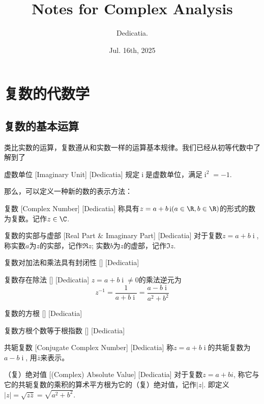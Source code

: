 \documentclass[UTF8]{ctexart}
\title{Notes for Complex Analysis}
\author{Dedicatia.}
\date{Jul. 16th, 2025}
\DeclareMathOperator{\ii}{\mathrm{i}}
\begin{document}
\maketitle
\newpage
\tableofcontents
\newpage
\section{复数的代数学}
\subsection{复数的基本运算}
类比实数的运算，复数遵从和实数一样的运算基本规律。我们已经从初等代数中了解到了
\begin{dfn}
    [UUID]
    {虚数单位}
    [Imaginary Unit]
    [Dedicatia]
    规定$\ii$是虚数单位，满足$\ii^2=-1$.
\end{dfn}
那么，可以定义一种新的数的表示方法：
\begin{dfn}
    [UUID]
    {复数}
    [Complex Number]
    [Dedicatia]
    称具有$z=a+b\ii (a\in\R, b\in\R)$的形式的数为复数。记作$z\in\C$.
\end{dfn}
\begin{dfn}
    [UUID]
    {复数的实部与虚部}
    [Real Part \& Imaginary Part]
    [Dedicatia]
    对于复数$z=a+b\ii$, 称实数$a$为$z$的实部，记作$\Re z$; 实数$b$为$z$的虚部，记作$\Im z$.
\end{dfn}
\begin{thm}
    [UUID]
    {复数对加法和乘法具有封闭性}
    []
    [Dedicatia]
\end{thm}
\begin{thm}
    [UUID]
    {复数存在除法}
    []
    [Dedicatia]
    $z=a+b\ii\neq 0$的乘法逆元为
    \[z^{-1}=\frac{1}{a+b\ii}=\frac{a-b\ii}{a^2+b^2}\]
\end{thm}
\begin{dfn}
    [UUID]
    {复数的方根}
    []
    [Dedicatia]
\end{dfn}
\begin{ppt}
    [UUID]
    {复数方根个数等于根指数}
    []
    [Dedicatia]
\end{ppt}
\begin{dfn}
    [UUID]
    {共轭复数}
    [Conjugate Complex Number]
    [Dedicatia]
    称$z=a+b\ii$的共轭复数为$a-b\ii$, 用$\bar{z}$来表示。
\end{dfn}
\begin{dfn}
    [UUID]
    {（复）绝对值}
    [(Complex) Absolute Value]
    [Dedicatia]
    对于复数$z=a+bi$, 称它与它的共轭复数的乘积的算术平方根为它的（复）绝对值，记作$|z|$. 即定义$|z|=\sqrt{z\bar{z}}=\sqrt{a^2+b^2}$.
\end{dfn}
\end{document}
